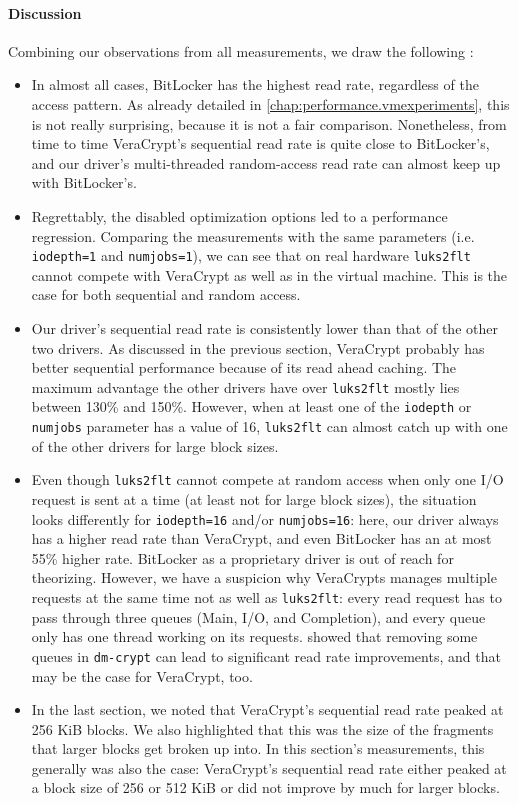 \paragraph{Discussion}
Combining our observations from all measurements, we draw the following :
\begin{itemize}[beginpenalty=10000]
	\item In almost all cases, BitLocker has the highest read rate, regardless of the access pattern. As already detailed in \autoref{chap:performance.vmexperiments}, this is not really surprising, because it is not a fair comparison. Nonetheless, from time to time VeraCrypt's sequential read rate is quite close to BitLocker's, and our driver's multi-threaded random-access read rate can almost keep up with BitLocker's.
	\item Regrettably, the disabled optimization options led to a performance regression. Comparing the measurements with the same parameters (i.e. \texttt{iodepth=1} and \texttt{numjobs=1}), we can see that on real hardware \texttt{luks2flt} cannot compete with VeraCrypt as well as in the virtual machine. This is the case for both sequential and random access. 
	\item Our driver's sequential read rate is consistently lower than that of the other two drivers. As discussed in the previous section, VeraCrypt probably has better sequential performance because of its read ahead caching. The maximum advantage the other drivers have over \texttt{luks2flt} mostly lies between 130\% and 150\%. However, when at least one of the \texttt{iodepth} or \texttt{numjobs} parameter has a value of 16, \texttt{luks2flt} can almost catch up with one of the other drivers for large block sizes.
	\item Even though \texttt{luks2flt} cannot compete at random access when only one I/O request is sent at a time (at least not for large block sizes), the situation looks differently for \texttt{iodepth=16} and/or \texttt{numjobs=16}: here, our driver always has a higher read rate than VeraCrypt, and even BitLocker has an at most 55\% higher rate. BitLocker as a proprietary driver is out of reach for theorizing. However, we have a suspicion why VeraCrypts manages multiple requests at the same time not as well as \texttt{luks2flt}: every read request has to pass through three queues (Main, I/O, and Completion), and every queue only has one thread working on its requests. \cite{Korchagin2020} showed that removing some queues in \texttt{dm-crypt} can lead to significant read rate improvements, and that may be the case for VeraCrypt, too.
	\item In the last section, we noted that VeraCrypt's sequential read rate peaked at 256 KiB blocks. We also highlighted that this was the size of the fragments that larger blocks get broken up into. In this section's measurements, this generally was also the case: VeraCrypt's sequential read rate either peaked at a block size of 256 or 512 KiB or did not improve by much for larger blocks.
\end{itemize}

